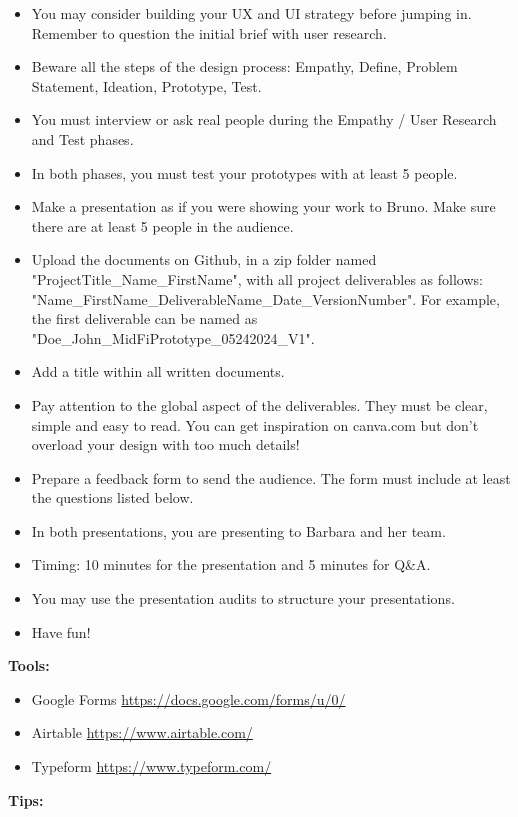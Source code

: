 \begin{itemize}
\item You may consider building your UX and UI strategy before jumping in. Remember to question the initial brief with user research.
\item Beware all the steps of the design process: Empathy, Define, Problem Statement, Ideation, Prototype, Test.
\item You must interview or ask real people during the Empathy / User Research and Test phases.
\item In both phases, you must test your prototypes with at least 5 people.
\item Make a presentation as if you were showing your work to Bruno. Make sure there are at least 5 people in the audience.
\item Upload the documents on Github, in a zip folder named "ProjectTitle\_Name\_FirstName", with all project deliverables as follows: "Name\_FirstName\_DeliverableName\_Date\_VersionNumber".  For example, the first deliverable can be named as "Doe\_John\_MidFiPrototype\_05242024\_V1".
\item Add a title within all written documents.
\item Pay attention to the global aspect of the deliverables. They must be clear, simple and easy to read. You can get inspiration on canva.com but don't overload your design with too much details!
\item Prepare a feedback form to send the audience. The form must include at least the questions listed below.
\item In both presentations, you are presenting to Barbara and her team.
\item Timing: 10 minutes for the presentation and 5 minutes for Q\&A.
\item You may use the presentation audits to structure your presentations.
\item Have fun!
\end{itemize}

\textbf{Tools:}

\begin{itemize}
\item Google Forms \url{https://docs.google.com/forms/u/0/}
\item Airtable \url{https://www.airtable.com/}
\item Typeform \url{https://www.typeform.com/}
\end{itemize}

\textbf{Tips:}

